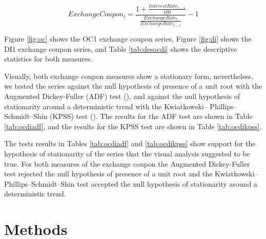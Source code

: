 \documentclass[cic,tc, english]{iiufrgs}
\begin{document}
    \begin{equation}
        \label{eqn:coupon}
        ExchangeCoupon_t = \frac{1 + \frac{InterestRate_{t-1}}{100}}{\frac{ExchangeRate_t}{ExchangeRate_{t-1}}} - 1
    \end{equation}

    Figure \ref{fig:oc} shows the OC1 exchange coupon series, Figure \ref{fig:di} shows the DI1 exchange coupon series, and Table \ref{tab:desocdi} shows the descriptive statistics for both measures.

    

    

    

    Visually, both exchange coupon measures show a stationary form, nevertheless, we tested the series against the null hypothesis of presence of a unit root with the Augmented Dickey-Fuller (ADF) test (\citet{adf}), and against the null hypothesis of stationarity around a deterministic trend with the Kwiatkowski– Phillips–Schmidt–Shin (KPSS) test (\citet{kpss}). The results for the ADF test are shown in Table \ref{tab:ocdiadf}, and the results for the KPSS test are shown in Table \ref{tab:ocdikpss}.

    

    

    The tests results in Tables \ref{tab:ocdiadf} and \ref{tab:ocdikpss} show support for the hypothesis of stationarity of the series that the visual analysis suggested to be true. For both measures of the exchange coupon the Augmented Dickey-Fuller test rejected the null hypothesis of presence of a unit root and the Kwiatkowski– Phillips–Schmidt–Shin test accepted the null hypothesis of stationarity around a deterministic trend.
    
    \begin{comment}
        On ten of October 2015 a impeachment request for president Dilma Rousseff was handed to the Chamber Of Representatives' president, who accepted the request on December second. The opening of the impeachment process was accepted by the special impeachment committee on eleven of April 2016.
    \end{comment}

\section{Methods} \label{chapter_methods}
\end{document}
